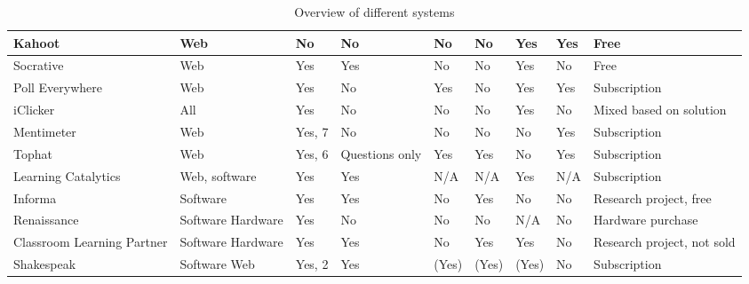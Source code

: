\begin{landscape}
\begin{center}
\begin{table}[H]
\begin{tabularx}{\paperwidth}{ |X|X|X|X|X|X|X|X|X| }
              Kahoot                & Web   & No    & No    & No    & No    & Yes   & Yes   & Free \\ \hline
              Socrative             & Web   & Yes   & Yes   & No    & No    & Yes   & No    & Free \\ \hline
              Poll Everywhere       & Web   & Yes   & No    & Yes   & No    & Yes   & Yes   & Subscription \\ \hline
              iClicker              & All   & Yes   & No    & No    & No    & Yes   & No    & Mixed based on solution \\ \hline
              Mentimeter            & Web   & Yes, 7 & No   & No    & No    & No    & Yes   & Subscription \\ \hline
              Tophat                & Web   & Yes, 6 & Questions only & Yes & Yes   & No    & Yes & Subscription \\ \hline
              Learning Catalytics   & Web, software   & Yes    & Yes  & N/A   & N/A   & Yes   & N/A   & Subscription \\ \hline
              Informa        & Software & Yes & Yes  & No & Yes   & No    & No    & Research project, free \\ \hline
              Renaissance           & Software \newline Hardware & Yes & No & No & No & N/A & No & Hardware purchase \\ \hline
              Classroom Learning Partner & Software \newline Hardware & Yes & Yes & No & Yes & Yes & No & Research project, not sold \\
             \hline
             Shakespeak & Software \newline Web & Yes, 2 & Yes & (Yes) & (Yes) & (Yes) & No & Subscription \\
             \hline
            \end{tabularx}
            \caption{Overview of different systems}\label{tab:overview}
        \end{table}
    \end{center}
\end{landscape}





